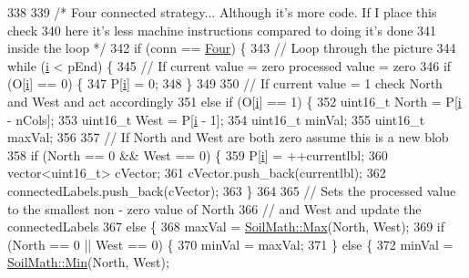 \begin{DoxyCode}
338 
339   \textcolor{comment}{/* Four connected strategy... Although it's more code. If I place this check}
340 \textcolor{comment}{  here it's less machine instructions compared to doing it's done}
341 \textcolor{comment}{  inside the loop */}
342   \textcolor{keywordflow}{if} (conn == \hyperlink{class_vision_1_1_segment_a330240c08320e72270fac0aa83d5e27ea1fca5ab1c285c0edd2bdc3072cab0c01}{Four}) \{
343     \textcolor{comment}{// Loop through the picture}
344     \textcolor{keywordflow}{while} (\hyperlink{_comparision_pictures_2_createtest_image_8m_a6f6ccfcf58b31cb6412107d9d5281426}{i} < pEnd) \{
345       \textcolor{comment}{// If current value = zero processed value = zero}
346       \textcolor{keywordflow}{if} (O[\hyperlink{_comparision_pictures_2_createtest_image_8m_a6f6ccfcf58b31cb6412107d9d5281426}{i}] == 0) \{
347         P[\hyperlink{_comparision_pictures_2_createtest_image_8m_a6f6ccfcf58b31cb6412107d9d5281426}{i}] = 0;
348       \}
349 
350       \textcolor{comment}{// If current value = 1 check North and West and act accordingly}
351       \textcolor{keywordflow}{else} \textcolor{keywordflow}{if} (O[\hyperlink{_comparision_pictures_2_createtest_image_8m_a6f6ccfcf58b31cb6412107d9d5281426}{i}] == 1) \{
352         uint16\_t North = P[\hyperlink{_comparision_pictures_2_createtest_image_8m_a6f6ccfcf58b31cb6412107d9d5281426}{i} - nCols];
353         uint16\_t West = P[\hyperlink{_comparision_pictures_2_createtest_image_8m_a6f6ccfcf58b31cb6412107d9d5281426}{i} - 1];
354         uint16\_t minVal;
355         uint16\_t maxVal;
356 
357         \textcolor{comment}{// If North and West are both zero assume this is a new blob}
358         \textcolor{keywordflow}{if} (North == 0 && West == 0) \{
359           P[\hyperlink{_comparision_pictures_2_createtest_image_8m_a6f6ccfcf58b31cb6412107d9d5281426}{i}] = ++currentlbl;
360           vector<uint16\_t> cVector;
361           cVector.push\_back(currentlbl);
362           connectedLabels.push\_back(cVector);
363         \}
364 
365         \textcolor{comment}{// Sets the processed value to the smallest non - zero value of North}
366         \textcolor{comment}{// and West and update the connectedLabels}
367         \textcolor{keywordflow}{else} \{
368           maxVal = \hyperlink{namespace_soil_math_a9d385c44fb7e60a278a6eee8446f7b64}{SoilMath::Max}(North, West);
369           \textcolor{keywordflow}{if} (North == 0 || West == 0) \{
370             minVal = maxVal;
371           \} \textcolor{keywordflow}{else} \{
372             minVal = \hyperlink{namespace_soil_math_ad458fb6889451aa72a4a7097d10490a5}{SoilMath::Min}(North, West);

\end{DoxyCode}
